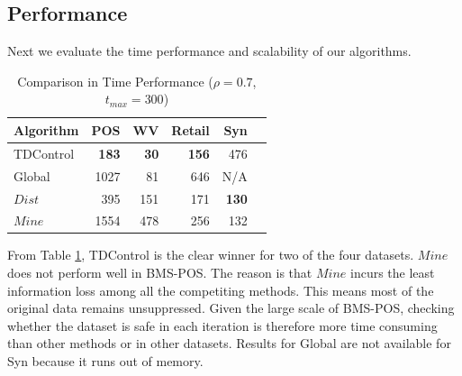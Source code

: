 \subsection{Performance}\label{sec:eval:performance}
Next we evaluate the time performance and scalability of
our algorithms.

\begin{table}[bh]
\caption{Comparison in Time Performance ($\rho=0.7$, $t_{max}=300$)
\label{tab:timeresult}}
\centering
\begin{tabular}{|l|r|r|r|r|r|}
  \hline
  Algorithm & POS & WV & Retail  &Syn \\  \hline \hline
  TDControl & \bf{183} & \bf{30 }& \bf{156} &   476  \\  \hline
  Global & 1027 & 81 & 646 &   N/A  \\  \hline
  $Dist$ & 395 & 151 & 171 &\bf{130}\\ \hline
  $Mine$ & 1554 & 478& 256 & 132\\ \hline
  \end{tabular}
\end{table}

From Table \ref{tab:timeresult}, TDControl is the clear winner
for two of the four datasets. $Mine$ does not perform well in BMS-POS.
The reason is that $Mine$ incurs the least information loss among all the
competiting methods. This means most of the original data remains
unsuppressed. Given the large scale of BMS-POS, checking whether the
dataset is safe in each iteration is therefore more time consuming than
other methods or in other datasets.
Results for Global are not available for Syn because
it runs out of memory.

